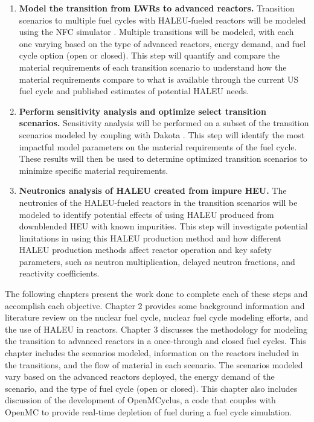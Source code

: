 \begin{enumerate}
\item \textbf{Model the transition from \glspl{LWR} to advanced reactors.} 
Transition scenarios to multiple fuel cycles with \gls{HALEU}-fueled 
reactors will 
be modeled using the \gls{NFC} simulator \Cyclus \cite{huff_fundamental_2016}. 
Multiple transitions will be modeled, with each one varying based on the type
of  
advanced reactors, energy demand, and fuel cycle option (open or closed). This 
step will quantify and compare the material requirements of each transition 
scenario to understand how the material requirements compare to what is available 
through the current US fuel cycle and published estimates of potential 
\gls{HALEU} needs. 

\item \textbf{Perform sensitivity analysis and optimize select transition scenarios.}
Sensitivity analysis will be performed on a subset of the transition scenarios
modeled by coupling \Cyclus with Dakota \cite{adams_dakota_2019}. This step 
will identify the most impactful model parameters on 
the material requirements of the fuel cycle. These results will then be 
used to determine optimized transition scenarios to minimize specific 
material requirements. 

\item \textbf{Neutronics analysis of \gls{HALEU} created from impure \gls{HEU}.}
The neutronics of the \gls{HALEU}-fueled reactors in the transition scenarios 
will be modeled to identify potential effects of using \gls{HALEU} produced 
from downblended \gls{HEU} with known impurities. This step will investigate 
potential limitations in using this \gls{HALEU} production method and 
how different \gls{HALEU} production methods affect reactor operation and 
key safety parameters, such as neutron multiplication, delayed neutron 
fractions, and reactivity coefficients.
\end{enumerate}


The following chapters present the work done to complete each of 
these steps and accomplish each objective. Chapter 2 
provides some 
background information and literature review on the nuclear fuel cycle,
nuclear fuel cycle 
modeling efforts, and the use of \gls{HALEU} in reactors.
Chapter 3 discusses the methodology for modeling the transition to advanced 
reactors in a once-through and closed fuel cycles. This chapter includes 
the scenarios modeled, information on the reactors included in the 
transitions, and the flow of 
material in each scenario. The scenarios modeled vary based on the 
advanced reactors deployed, the energy demand of the scenario, and the 
type of fuel cycle (open or closed). This chapter also includes discussion 
of the development of OpenMCyclus, a code that couples \Cyclus with OpenMC 
to provide real-time depletion of fuel during a fuel cycle simulation.

